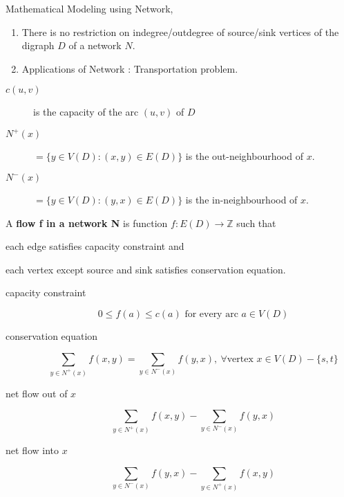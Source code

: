 \begin{remark} Mathematical Modeling using Network,
	\begin{enumerate}
		\item There is no restriction on indegree/outdegree of source/sink vertices of the digraph $D$ of a network $N$.
		\item Applications of Network : Transportation problem.
	\end{enumerate}
\end{remark}

\begin{description}
	\item[$c(u,v)$] is the capacity of the arc $(u,v)$ of $D$
	\item[$N^+(x)$] $= \{ y \in V(D) : (x,y) \in E(D)\}$ is the out-neighbourhood of $x$.
	\item[$N^-(x)$] $= \{ y \in V(D) : (y,x) \in E(D)\}$ is the in-neighbourhood of $x$.
\end{description}

\begin{definition}
	A \textbf{flow f in a network N} is function $f : E(D) \to \mathbb{Z}$ such that
	\begin{enumerate*}
		\item each edge satisfies capacity constraint and
		\item each vertex except source and sink satisfies conservation equation.
	\end{enumerate*}
\end{definition}

\begin{description}
	\item[capacity constraint] 
		\begin{equation}
		0 \le f(a) \le c(a) \text{ for every arc }a \in V(D)
		\end{equation}
	\item[conservation equation] 
		\begin{equation}
			\sum_{y \in N^+(x)} f(x,y) = \sum_{y \in N^-(x)} f(y,x),\ \forall \text{vertex } x \in V(D)-\{s,t\}
		\label{equ:conservation}
		\end{equation}
	\item[net flow out of $x$] $$\sum_{y \in N^+(x)} f(x,y) - \sum_{y \in N^-(x)} f(y,x)$$
	\item[net flow into $x$] $$\sum_{y \in N^-(x)} f(y,x) - \sum_{y \in N^+(x)} f(x,y)$$
\end{description}

